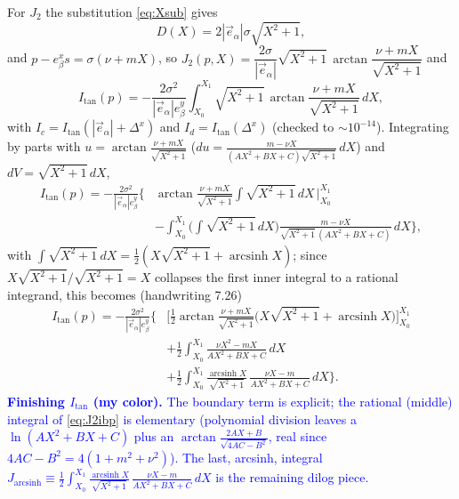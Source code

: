 \documentclass[11pt]{article}
\numberwithin{equation}{section}
\newcommand{\vv}[1]{\vec{#1}}
\newcommand{\half}{\tfrac{1}{2}}
\DeclareMathOperator{\arcsinh}{arcsinh}
\newcommand{\cam}[1]{\textcolor{blue}{#1}}
\begin{document}
For $J_2$ the substitution \eqref{eq:Xsub} gives
\begin{equation}\label{eq:Dx}
  D(X)=2|\vv e_\alpha|\sigma\sqrt{X^2+1},
\end{equation}
and $p-e_\beta^x s=\sigma(\nu+mX)$, so $J_2(p,X)=\dfrac{2\sigma}{|\vv e_\alpha|}
\sqrt{X^2+1}\,\arctan\dfrac{\nu+mX}{\sqrt{X^2+1}}$ and
\begin{equation}\label{eq:J2red}
  I_{\tan}(p)=-\frac{2\sigma^2}{|\vv e_\alpha|e_\beta^y}\int_{X_0}^{X_1}\!\sqrt{X^2+1}\,
  \arctan\frac{\nu+mX}{\sqrt{X^2+1}}\,dX ,
\end{equation}
with $I_c=I_{\tan}(|\vv e_\alpha|+\Delta^x)$ and $I_d=I_{\tan}(\Delta^x)$ (checked to $\sim10^{-14}$).
Integrating by parts with $u=\arctan\frac{\nu+mX}{\sqrt{X^2+1}}$ ($du=\frac{m-\nu X}{(AX^2+BX+C)
\sqrt{X^2+1}}\,dX$) and $dV=\sqrt{X^2+1}\,dX$,
\begin{equation}\label{eq:J2ibp-raw}
\begin{aligned}
  I_{\tan}(p)=-\frac{2\sigma^2}{|\vv e_\alpha|e_\beta^y}\bigg\{&
  \arctan\tfrac{\nu+mX}{\sqrt{X^2+1}}\!\int\!\sqrt{X^2+1}\,dX\,\Big|_{X_0}^{X_1}\\
  &-\int_{X_0}^{X_1}\!\Big(\!\int\!\sqrt{X^2+1}\,dX\Big)\frac{m-\nu X}{\sqrt{X^2+1}\,(AX^2+BX+C)}\,dX\bigg\},
\end{aligned}
\end{equation}
with $\int\sqrt{X^2+1}\,dX=\tfrac12(X\sqrt{X^2+1}+\arcsinh X)$; since $X\sqrt{X^2+1}/\sqrt{X^2+1}=X$
collapses the first inner integral to a rational integrand, this becomes (handwriting 7.26)
\begin{equation}\label{eq:J2ibp}
\begin{aligned}
  I_{\tan}(p)=-\frac{2\sigma^2}{|\vv e_\alpha|e_\beta^y}\bigg\{&
  \Big[\tfrac12\arctan\tfrac{\nu+mX}{\sqrt{X^2+1}}\big(X\sqrt{X^2+1}+\operatorname{arcsinh}X\big)\Big]_{X_0}^{X_1}\\
  &+\tfrac12\!\int_{X_0}^{X_1}\!\frac{\nu X^2-mX}{AX^2+BX+C}\,dX\\
  &+\tfrac12\!\int_{X_0}^{X_1}\!\frac{\operatorname{arcsinh}X}{\sqrt{X^2+1}}\,
  \frac{\nu X-m}{AX^2+BX+C}\,dX\bigg\}.
\end{aligned}
\end{equation}
\cam{\textbf{Finishing $I_{\tan}$ (my color).} The boundary term is explicit; the rational (middle)
integral of \eqref{eq:J2ibp} is elementary (polynomial division leaves a $\ln(AX^2{+}BX{+}C)$ plus an
$\arctan\frac{2AX+B}{\sqrt{4AC-B^2}}$, real since $4AC-B^2=4(1+m^2+\nu^2)$). The last, arcsinh, integral
$J_{\arcsinh}\equiv\half\!\int_{X_0}^{X_1}\tfrac{\arcsinh X}{\sqrt{X^2+1}}\,\tfrac{\nu X-m}{AX^2+BX+C}\,dX$
is the remaining dilog piece.}
\end{document}
